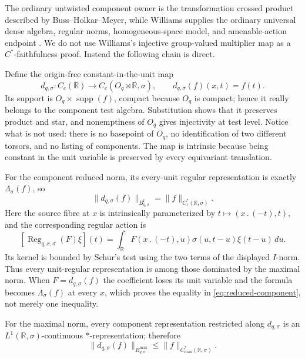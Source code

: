 \documentclass[11pt]{article}
\theoremstyle{definition}
\newcommand{\R}{\mathbb R}
\newcommand{\supp}{\operatorname{supp}}
\newcommand{\cstarmax}{C^*_{\max}}
\newcommand{\cstarred}{C^*_{\mathrm r}}
\begin{document}
The ordinary untwisted component owner is the transformation crossed
product described by Buss--Holkar--Meyer, while Williams supplies the
ordinary universal dense algebra, regular norms, homogeneous-space model,
and amenable-action endpoint \citep[Lemma 2.27, Remarks 2.29--2.30,
Theorem 4.30, and Theorem 7.13]{Williams2007CrossedProducts}.  We do not use
Williams's injective group-valued multiplier map as a $C^*$-faithfulness
proof.  Instead the following chain is direct.

Define the origin-free constant-in-the-unit map
\[
 d_{q,\sigma}:C_c(\R)\longrightarrow C_c(O_q\rtimes\R,\sigma),
 \qquad d_{q,\sigma}(f)(x,t)=f(t).
\]
Its support is $O_q\times\supp(f)$, compact because $O_q$ is compact; hence
it really belongs to the component test algebra.  Substitution shows that it
preserves product and star, and nonemptiness of $O_q$ gives injectivity at
test level.  Notice what is not used: there is no basepoint of $O_q$, no
identification of two different torsors, and no listing of components.  The
map is intrinsic because being constant in the unit variable is preserved by
every equivariant translation.

For the component
reduced norm, its every-unit regular representation is exactly
$\Lambda_\sigma(f)$, so
\begin{equation}\label{eq:reduced-component}
 \lVert d_{q,\sigma}(f)\rVert_{B_{q,\sigma}^{\mathrm r}}
 =\lVert f\rVert_{\cstarred(\R,\sigma)}.
\end{equation}
Here the source fibre at $x$ is intrinsically parameterized by
$t\mapsto(x\mathbin{.}(-t),t)$, and the corresponding regular action is
\[
 [\operatorname{Reg}_{q,x,\sigma}(F)\xi](t)
 =\int_{\R}F(x\mathbin{.}(-t),u)\sigma(u,t-u)
       \xi(t-u)\,du.
\]
Its kernel is bounded by Schur's test using the two terms of the displayed
$I$-norm.  Thus every unit-regular representation is among those dominated
by the maximal norm.  When $F=d_{q,\sigma}(f)$ the coefficient loses its
unit variable and the formula becomes $\Lambda_\sigma(f)$ at every $x$,
which proves the equality in \cref{eq:reduced-component}, not merely one
inequality.

For the maximal norm, every component representation restricted along
$d_{q,\sigma}$ is an $L^1(\R,\sigma)$-continuous $*$-representation;
therefore
\begin{equation}\label{eq:max-component}
 \lVert d_{q,\sigma}(f)\rVert_{B_{q,\sigma}^{\max}}
 \leq \lVert f\rVert_{\cstarmax(\R,\sigma)}.
\end{equation}
\end{document}
